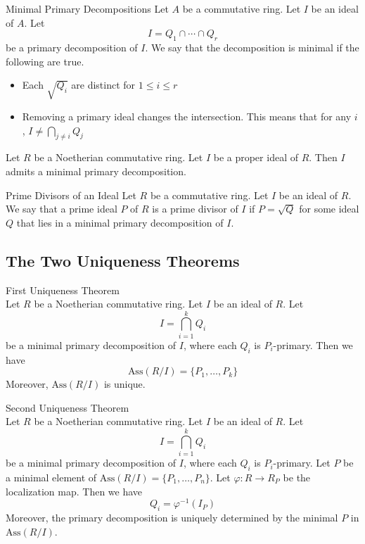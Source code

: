 \documentclass[a4paper]{article}
\begin{document}
\begin{defn}{Minimal Primary Decompositions}{} Let $A$ be a commutative ring. Let $I$ be an ideal of $A$. Let $$I=Q_1\cap\cdots\cap Q_r$$ be a primary decomposition of $I$. We say that the decomposition is minimal if the following are true. 
\begin{itemize}
\item Each $\sqrt{Q_i}$ are distinct for $1\leq i\leq r$
\item Removing a primary ideal changes the intersection. This means that for any $i$, $I\neq\bigcap_{j\neq i}Q_j$
\end{itemize}
\end{defn}

\begin{thm}{}{} Let $R$ be a Noetherian commutative ring. Let $I$ be a proper ideal of $R$. Then $I$ admits a minimal primary decomposition. 
\end{thm}

\begin{defn}{Prime Divisors of an Ideal}{} Let $R$ be a commutative ring. Let $I$ be an ideal of $R$. We say that a prime ideal $P$ of $R$ is a prime divisor of $I$ if $P=\sqrt{Q}$ for some ideal $Q$ that lies in a minimal primary decomposition of $I$. 
\end{defn}

\subsection{The Two Uniqueness Theorems}
\begin{thm}{First Uniqueness Theorem}{}\\
Let $R$ be a Noetherian commutative ring. Let $I$ be an ideal of $R$. Let $$I=\bigcap_{i=1}^kQ_i$$ be a minimal primary decomposition of $I$, where each $Q_i$ is $P_i$-primary. Then we have $$\text{Ass}(R/I)=\{P_1,\dots,P_k\}$$ Moreover, $\text{Ass}(R/I)$ is unique. 
\end{thm}

\begin{thm}{Second Uniqueness Theorem}{}\\
Let $R$ be a Noetherian commutative ring. Let $I$ be an ideal of $R$. Let $$I=\bigcap_{i=1}^kQ_i$$ be a minimal primary decomposition of $I$, where each $Q_i$ is $P_i$-primary. Let $P$ be a minimal element of $\text{Ass}(R/I)=\{P_1,\dots,P_n\}$. Let $\varphi:R\to R_P$ be the localization map. Then we have $$Q_i=\varphi^{-1}(I_P)$$ Moreover, the primary decomposition is uniquely determined by the minimal $P$ in $\text{Ass}(R/I)$. 
\end{thm}
\end{document}
